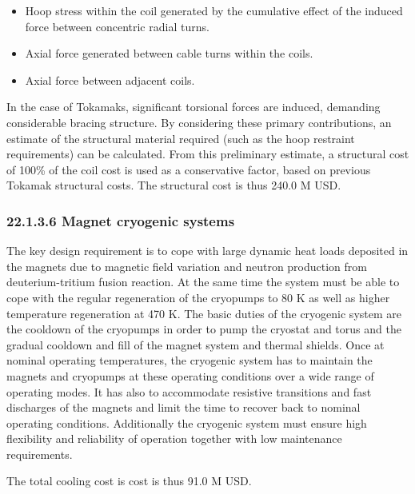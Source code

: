 \begin{itemize}
    \item Hoop stress within the coil generated by the cumulative effect of the induced force between concentric radial turns.
    \item Axial force generated between cable turns within the coils. 
    \item Axial force between adjacent coils.
\end{itemize}


In the case of Tokamaks, significant torsional forces are induced, demanding considerable bracing structure. By considering these primary contributions, an estimate of the structural material required (such as the hoop restraint requirements) can be calculated. From this preliminary estimate, a structural cost of 100\% of the coil cost is used as a conservative factor, based on previous Tokamak structural costs. The structural cost is thus 240.0 M USD.


\subsubsection*{22.1.3.6 Magnet cryogenic systems}

The key design requirement is to cope with large dynamic heat loads deposited in the
magnets due to magnetic field variation and neutron production from deuterium-tritium
fusion reaction. At the same time the system must be able to cope with the regular
regeneration of the cryopumps to 80 K as well as higher temperature regeneration at 470 K.
The basic duties of the cryogenic system are the cooldown of the cryopumps in order
to pump the cryostat and torus and the gradual cooldown and fill of the magnet system and
thermal shields. Once at nominal operating temperatures, the cryogenic system has to
maintain the magnets and cryopumps at these operating conditions over a wide range of
operating modes. It has also to accommodate resistive transitions and fast discharges of the
magnets and limit the time to recover back to nominal operating conditions. Additionally
the cryogenic system must ensure high flexibility and reliability of operation together with
low maintenance requirements.

The total cooling cost is cost is thus 91.0 M USD.



